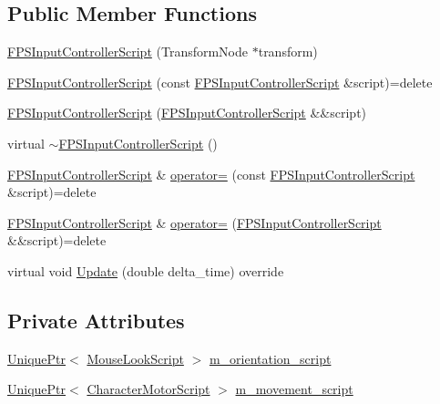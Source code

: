 \subsection*{Public Member Functions}
\begin{DoxyCompactItemize}
\item 
\hyperlink{classmage_1_1_f_p_s_input_controller_script_afb654c7011472ef300658503efaf1767}{F\+P\+S\+Input\+Controller\+Script} (Transform\+Node $\ast$transform)
\item 
\hyperlink{classmage_1_1_f_p_s_input_controller_script_ad47bd24645ec8a7b08c3048c92ed56fd}{F\+P\+S\+Input\+Controller\+Script} (const \hyperlink{classmage_1_1_f_p_s_input_controller_script}{F\+P\+S\+Input\+Controller\+Script} \&script)=delete
\item 
\hyperlink{classmage_1_1_f_p_s_input_controller_script_ad6919f0f67c16499ac467d400f96a4b5}{F\+P\+S\+Input\+Controller\+Script} (\hyperlink{classmage_1_1_f_p_s_input_controller_script}{F\+P\+S\+Input\+Controller\+Script} \&\&script)
\item 
virtual \hyperlink{classmage_1_1_f_p_s_input_controller_script_aab7082be73c735e0977e9efbbca72d98}{$\sim$\+F\+P\+S\+Input\+Controller\+Script} ()
\item 
\hyperlink{classmage_1_1_f_p_s_input_controller_script}{F\+P\+S\+Input\+Controller\+Script} \& \hyperlink{classmage_1_1_f_p_s_input_controller_script_a226a1fb2eecbd7ecdf2033a8f5460e8b}{operator=} (const \hyperlink{classmage_1_1_f_p_s_input_controller_script}{F\+P\+S\+Input\+Controller\+Script} \&script)=delete
\item 
\hyperlink{classmage_1_1_f_p_s_input_controller_script}{F\+P\+S\+Input\+Controller\+Script} \& \hyperlink{classmage_1_1_f_p_s_input_controller_script_adac34abea3d474bf8183c2555dde9034}{operator=} (\hyperlink{classmage_1_1_f_p_s_input_controller_script}{F\+P\+S\+Input\+Controller\+Script} \&\&script)=delete
\item 
virtual void \hyperlink{classmage_1_1_f_p_s_input_controller_script_ab78955a67341970a41b21ae943b81585}{Update} (double delta\+\_\+time) override
\end{DoxyCompactItemize}
\subsection*{Private Attributes}
\begin{DoxyCompactItemize}
\item 
\hyperlink{namespacemage_a3316d7143a973e37adf1110f2e80ca31}{Unique\+Ptr}$<$ \hyperlink{classmage_1_1_mouse_look_script}{Mouse\+Look\+Script} $>$ \hyperlink{classmage_1_1_f_p_s_input_controller_script_a22d47829d2bf8ef73d20e531b3be4165}{m\+\_\+orientation\+\_\+script}
\item 
\hyperlink{namespacemage_a3316d7143a973e37adf1110f2e80ca31}{Unique\+Ptr}$<$ \hyperlink{classmage_1_1_character_motor_script}{Character\+Motor\+Script} $>$ \hyperlink{classmage_1_1_f_p_s_input_controller_script_adef81e743004c4c182ceb71f9bc35ab6}{m\+\_\+movement\+\_\+script}
\end{DoxyCompactItemize}
